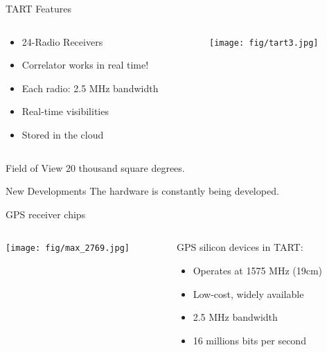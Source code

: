 \documentclass[ignorenonframetext]{beamer}
\begin{document}
\begin{frame}{TART Features}
 \begin{columns}
  \begin{column}{0.4\linewidth}
    \begin{itemize}
    \item 24-Radio Receivers
    \item Correlator works in real time!
    \item Each radio: 2.5 MHz bandwidth
    \item Real-time visibilities
    \item Stored in the cloud
    \end{itemize}
  \end{column}
  \begin{column}{0.6\linewidth}
    \texttt{[image: fig/tart3.jpg]}
  \end{column}
\end{columns}
\pause
    \begin{block}{Field of View}
20 thousand square degrees.
    \end{block}
    \begin{block}{New Developments}
The hardware is constantly being developed.
    \end{block}
\end{frame}

\begin{frame}{GPS receiver chips}
 \begin{columns}
  \begin{column}{0.5\linewidth}
    \texttt{[image: fig/max\_2769.jpg]}
  \end{column}
  \begin{column}{0.4\linewidth}
  GPS silicon devices in TART:
\begin{itemize}
 \item Operates at 1575 MHz (19cm)
 \item Low-cost, widely available
 \item 2.5 MHz bandwidth
 \item 16 millions bits per second
\end{itemize}
  \end{column}
  \end{columns}
\end{frame}
\end{document}
